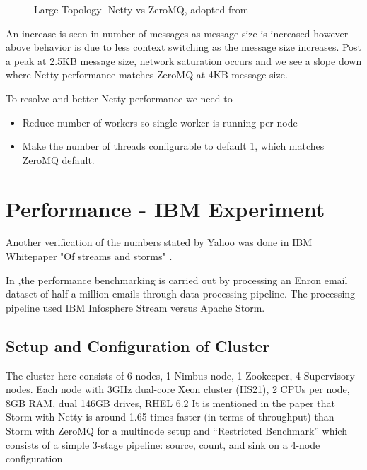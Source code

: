 \documentclass[9pt,twocolumn,twoside]{styles/osajnl}
\begin{document}
\begin{figure}[htbp]
	\centering
	\caption{Large Topology- Netty vs ZeroMQ, adopted from
          \cite{article-storm-netty}}
	\label{fig:NettyVsZMQFull}
\end{figure}

An increase is seen in number of messages as message size is increased
however above behavior is due to less context switching as the message
size increases. Post a peak at 2.5KB message size, network saturation
occurs and we see a slope down where Netty performance matches ZeroMQ
at 4KB message size.

To resolve and better Netty performance we need to-
\begin{itemize}
	\renewcommand{\labelitemi}{\scriptsize$\square$} 
	\item Reduce number of workers so single worker is running per
          node
        \item Make the number of threads configurable to default 1,
          which matches ZeroMQ default.
\end{itemize}

\section{Performance - IBM Experiment}
Another verification of the numbers stated by Yahoo was done in IBM
Whitepaper "Of streams and storms" \cite{article-nabi2014streams}.

In \cite{article-nabi2014streams},the performance benchmarking is
carried out by processing an Enron email dataset of half a million
emails through data processing pipeline. The processing pipeline used
IBM Infosphere Stream versus Apache Storm.

\subsection{Setup and Configuration of Cluster}
The cluster here consists of 6-nodes, 1 Nimbus node, 1 Zookeeper, 4
Supervisory nodes. Each node with 3GHz dual-core Xeon cluster (HS21),
2 CPUs per node, 8GB RAM, dual 146GB drives, RHEL 6.2 It is mentioned
in the paper that Storm with Netty is around 1.65 times faster (in
terms of throughput) than Storm with ZeroMQ for a multinode setup and
“Restricted Benchmark” which consists of a simple 3-stage pipeline:
source, count, and sink on a 4-node configuration
\end{document}
